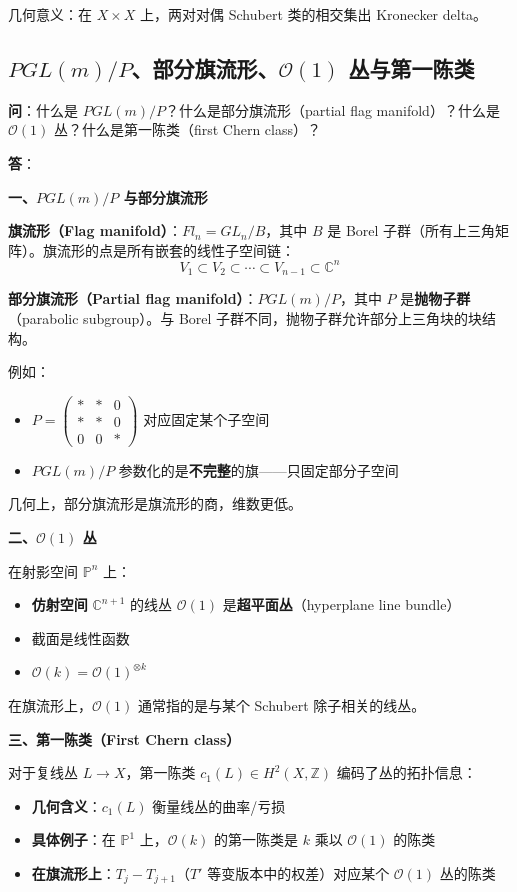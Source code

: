 几何意义：在 $X \times X$ 上，两对对偶 Schubert 类的相交集出 Kronecker delta。

\subsection{$PGL(m)/P$、部分旗流形、$\mathcal{O}(1)$ 丛与第一陈类}\label{sec:qa-PGLm-P-partial-flag-O1}
\textbf{问}：什么是 $PGL(m)/P$？什么是部分旗流形（partial flag manifold）？什么是 $\mathcal{O}(1)$ 丛？什么是第一陈类（first Chern class）？

\textbf{答}：

\textbf{一、$PGL(m)/P$ 与部分旗流形}

\textbf{旗流形（Flag manifold）}：$Fl_n = GL_n / B$，其中 $B$ 是 Borel 子群（所有上三角矩阵）。旗流形的点是所有嵌套的线性子空间链：
$$V_1 \subset V_2 \subset \cdots \subset V_{n-1} \subset \mathbb{C}^n$$

\textbf{部分旗流形（Partial flag manifold）}：$PGL(m)/P$，其中 $P$ 是\textbf{抛物子群}（parabolic subgroup）。与 Borel 子群不同，抛物子群允许部分上三角块的块结构。

例如：
\begin{itemize}
\item $P = \begin{pmatrix} * & * & 0 \\ * & * & 0 \\ 0 & 0 & * \end{pmatrix}$ 对应固定某个子空间
\item $PGL(m)/P$ 参数化的是\textbf{不完整}的旗——只固定部分子空间
\end{itemize}

几何上，部分旗流形是旗流形的商，维数更低。

\textbf{二、$\mathcal{O}(1)$ 丛}

在射影空间 $\mathbb{P}^n$ 上：
\begin{itemize}
\item \textbf{仿射空间} $\mathbb{C}^{n+1}$ 的线丛 $\mathcal{O}(1)$ 是\textbf{超平面丛}（hyperplane line bundle）
\item 截面是线性函数
\item $\mathcal{O}(k) = \mathcal{O}(1)^{\otimes k}$
\end{itemize}

在旗流形上，$\mathcal{O}(1)$ 通常指的是与某个 Schubert 除子相关的线丛。

\textbf{三、第一陈类（First Chern class）}

对于复线丛 $L \to X$，第一陈类 $c_1(L) \in H^2(X, \mathbb{Z})$ 编码了丛的拓扑信息：
\begin{itemize}
\item \textbf{几何含义}：$c_1(L)$ 衡量线丛的曲率/亏损
\item \textbf{具体例子}：在 $\mathbb{P}^1$ 上，$\mathcal{O}(k)$ 的第一陈类是 $k$ 乘以 $\mathcal{O}(1)$ 的陈类
\item \textbf{在旗流形上}：$T_j - T_{j+1}$（$T'$ 等变版本中的权差）对应某个 $\mathcal{O}(1)$ 丛的陈类
\end{itemize}

